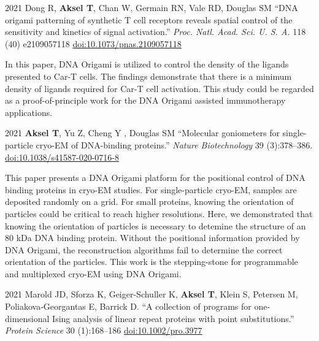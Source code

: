 \documentclass[12pt,letterpaper]{report}
\begin{document}
        \begin{tablist}

        \item[2021] \tab{}Dong R, \textbf{Aksel T}, Chan W, Germain RN, Vale RD, Douglas SM \enquote{DNA origami patterning of synthetic T cell receptors reveals spatial control of the sensitivity and kinetics of signal activation.} \textit{Proc. Natl. Acad. Sci. U. S. A.} 118 (40) e2109057118 \href{https://doi.org/10.1073/pnas.2109057118}{doi:10.1073/pnas.2109057118}

        \begin{addmargin}[1cm]{0cm} 
            In this paper, DNA Origami is utilized to control the density of the ligands presented to Car-T cells. The findings demonstrate that there is a minimum density of ligands required for Car-T cell activation. This study could be regarded as a proof-of-principle work for the DNA Origami assisted immunotherapy applications. 
        \end{addmargin} 

        \item[2021] \tab{}\textbf{Aksel T}, Yu Z, Cheng Y , Douglas SM \enquote{Molecular goniometers for single-particle cryo-EM of DNA-binding proteins.} \textit{Nature Biotechnology} 39 (3):378--386. \href{https://doi.org/10.1038/s41587-020-0716-8}{doi:10.1038/s41587-020-0716-8}
        
        \begin{addmargin}[1cm]{0cm}
            This paper presents a DNA Origami platform for the positional control of DNA binding proteins in cryo-EM studies. For single-particle cryo-EM, samples are deposited randomly on a grid. For small proteins, knowing the orientation of particles could be critical to reach higher resolutions. Here, we demonstrated that knowing the orientation of particles is necessary to detemine the structure of an 80 kDa DNA binding protein. Without the positional information provided by DNA Origami, the reconstruction algorithms fail to determine the correct orientation of the particles. This work is the stepping-stone for programmable and multiplexed cryo-EM using DNA Origami. 
        \end{addmargin}

        \item[2021] \tab{}Marold JD, Sforza K, Geiger-Schuller K, \textbf{Aksel T}, Klein S, Petersen M, Poliakova‐Georgantas E, Barrick D. \enquote{A collection of programs for one‐dimensional Ising analysis of linear repeat proteins with point substitutions.} \textit{Protein Science} 30 (1):168--186 \href{https://doi.org/10.1002/pro.3977}{doi:10.1002/pro.3977}
        

\end{tablist}
\end{document}
